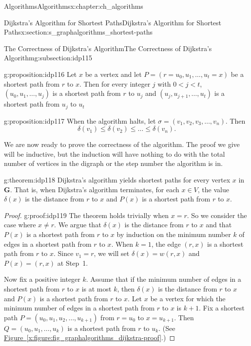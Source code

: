 \documentclass[oneside,10pt,]{book}
\newcommand{\xreffont}{\relax}
\numberwithin{equation}{section}
\newcommand{\bfG}{\mathbf{G}}
\newcommand{\lt}{<}
\begin{document}
\begin{chapterptx}{Algorithms}{}{Algorithms}{}{}{x:chapter:ch_algorithms}
\begin{sectionptx}{Dijkstra's Algorithm for Shortest Paths}{}{Dijkstra's Algorithm for Shortest Paths}{}{}{x:section:s_graphalgorithms_shortest-paths}
\begin{subsectionptx}{The Correctness of Dijkstra's Algorithm}{}{The Correctness of Dijkstra's Algorithm}{}{}{g:subsection:idp115}
\begin{proposition}{}{}{g:proposition:idp116}%
Let \(x\) be a vertex and let \(P=(r=u_0,u_1,\dots,u_t=x)\) be a shortest path from \(r\) to \(x\). Then for every integer \(j\) with \(0\lt j\lt t\), \((u_0,u_1,\dots,u_j)\) is a shortest path from \(r\) to \(u_j\) and \((u_j,u_{j+1},\dots,u_t)\) is a shortest path from \(u_j\) to \(u_t\)%
\end{proposition}
\begin{proposition}{}{}{g:proposition:idp117}%
When the algorithm halts, let \(\sigma=(v_1,v_2,v_3,\dots,v_n)\).  Then%
\begin{equation*}
\delta(v_1)\le \delta(v_2)\le\dots \le \delta(v_n).
\end{equation*}
%
\end{proposition}
We are now ready to prove the correctness of the algorithm. The proof we give will be inductive, but the induction will have nothing to do with the total number of vertices in the digraph or the step number the algorithm is in.%
\begin{theorem}{}{}{g:theorem:idp118}%
Dijkstra's algorithm yields shortest paths for every vertex \(x\) in \(\bfG\). That is, when Dijkstra's algorithm terminates, for each \(x\in V\), the value \(\delta(x)\) is the distance from \(r\) to \(x\) and \(P(x)\) is a shortest path from \(r\) to \(x\).%
\end{theorem}
\begin{proof}{}{g:proof:idp119}
The theorem holds trivially when \(x=r\). So we consider the case where \(x\neq r\). We argue that \(\delta(x)\) is the distance from \(r\) to \(x\) and that \(P(x)\) is a shortest path from \(r\) to \(x\) by induction on the minimum number \(k\) of edges in a shortest path from \(r\) to \(x\). When \(k=1\), the edge \((r,x)\) is a shortest path from \(r\) to \(x\). Since \(v_1=r\), we will set \(\delta(x)=w(r,x)\) and \(P(x)=(r,x)\) at Step~1.%
\par
Now fix a positive integer \(k\). Assume that if the minimum number of edges in a shortest path from \(r\) to \(x\) is at most \(k\), then \(\delta(x)\) is the distance from \(r\) to \(x\) and \(P(x)\) is a shortest path from \(r\) to \(x\). Let \(x\) be a vertex for which the minimum number of edges in a shortest path from \(r\) to \(x\) is \(k+1\). Fix a shortest path \(P=(u_0,u_1,u_2,\dots,u_{k+1})\) from \(r=u_0\) to \(x=u_{k+1}\). Then \(Q=(u_0,u_1,\dots,u_k)\) is a shortest path from \(r\) to \(u_k\). (See \hyperref[x:figure:fig_graphalgorithms_dijkstra-proof]{Figure~{\xreffont\ref{x:figure:fig_graphalgorithms_dijkstra-proof}}}.)%

\end{proof}
\end{subsectionptx}
\end{sectionptx}
\end{chapterptx}
\end{document}
